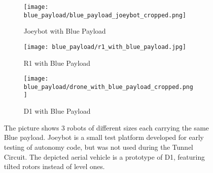 \begin{figure}
	\centering
	\begin{subfigure}{0.32\textwidth}
		\texttt{[image: blue\_payload/blue\_payload\_joeybot\_cropped.png]}
		\caption{Joeybot with Blue Payload}
		\label{joeybot blue payload}
	\end{subfigure}		
	\hfill
	\begin{subfigure}{0.32\textwidth}
		\texttt{[image: blue\_payload/r1\_with\_blue\_payload.jpg]}
		\caption{R1 with Blue Payload}
		\label{r1 blue payload}		
	\end{subfigure}
	\hfill
	\begin{subfigure}{0.32\textwidth}
		\texttt{[image: blue\_payload/drone\_with\_blue\_payload\_cropped.png]}
		\caption{D1 with Blue Payload}
		\label{d1 blue payload}
	\end{subfigure}	
	\caption[Early robots carrying the Blue payload]{The picture shows 3 robots of different sizes each carrying the same Blue payload. Joeybot is a small test platform developed for early testing of autonomy code, but was not used during the Tunnel Circuit. The depicted aerial vehicle is a prototype of D1, featuring tilted rotors instead of level ones.}
	\label{blue payload robots}
\end{figure}

